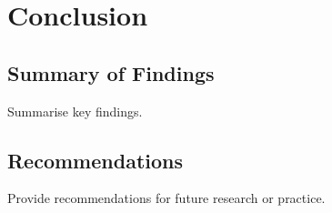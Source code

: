 \chapter{Conclusion}
\label{chap:conclusion}

\section{Summary of Findings}

Summarise key findings.

\section{Recommendations}

Provide recommendations for future research or practice.
